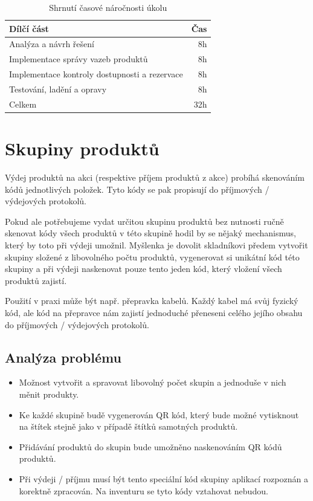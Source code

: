 \begin{table}
	\centering
	\caption[Časová náročnost úkolu na vázané produkty]{Shrnutí časové náročnosti úkolu}
	\label{tab:TopLevelTableLabel}
		\begin{tabular}{lr}
			\toprule
			Dílčí část & Čas\\
			\midrule
			Analýza a návrh řešení & 8h \\
			Implementace správy vazeb produktů & 8h \\
            Implementace kontroly dostupnosti a rezervace & 8h \\
            Testování, ladění a opravy & 8h \\
            \midrule
            Celkem  & 32h \\
			\midrule
		\end{tabular}
\end{table}


\section{Skupiny produktů}

Výdej produktů na akci (respektive příjem produktů z akce) probíhá skenováním kódů jednotlivých položek. Tyto kódy se pak propisují do příjmových / výdejových protokolů.

Pokud ale potřebujeme vydat určitou skupinu produktů bez nutnosti ručně skenovat kódy všech produktů v této skupině hodil by se nějaký mechanismus, který by toto při výdeji umožnil. Myšlenka je dovolit skladníkovi předem vytvořit skupiny složené z libovolného počtu produktů, vygenerovat si unikátní kód této skupiny a při výdeji naskenovat pouze tento jeden kód, který vložení všech produktů zajistí. 

Použití v praxi může být např. přepravka kabelů. Každý kabel má svůj fyzický kód, ale kód na přepravce nám zajistí jednoduché přeneseni celého jejího obsahu do příjmových / výdejových protokolů.

\subsection{Analýza problému}

\begin{itemize}
    \item Možnost vytvořit a spravovat libovolný počet skupin a jednoduše v nich měnit produkty.
    \item Ke každé skupině budě vygenerován QR kód, který bude možné vytisknout na štítek stejně jako v případě štítků samotných produktů.
    \item Přidávání produktů do skupin bude umožněno naskenováním QR kódů produktů.
    \item Při výdeji / příjmu musí být tento speciální kód skupiny aplikací rozpoznán a korektně zpracován. Na inventuru se tyto kódy vztahovat nebudou.
\end{itemize}

